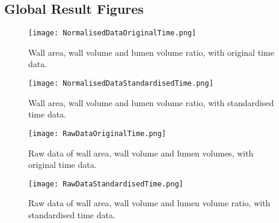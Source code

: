 \documentclass{article}
\begin{document}
\newpage
\subsection*{Global Result Figures}

\begin{figure}[h!]
\centering
\texttt{[image: NormalisedDataOriginalTime.png]}
\caption{Wall area, wall volume and lumen volume ratio, with original time data.}
\end{figure}


\begin{figure}[h!]
\centering
\texttt{[image: NormalisedDataStandardisedTime.png]}
\caption{Wall area, wall volume and lumen volume ratio, with standardised time data.}
\end{figure}


\begin{figure}[h!]
\centering
\texttt{[image: RawDataOriginalTime.png]}
\caption{Raw data of wall area, wall volume and lumen volumes, with original time data.}
\end{figure}

\begin{figure}[h!]
\centering
\texttt{[image: RawDataStandardisedTime.png]}
\caption{Raw data of wall area, wall volume and lumen volume ratio, with standardised time data.}
\end{figure}
\end{document}

